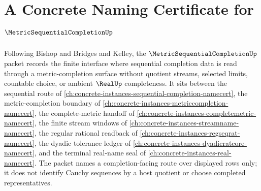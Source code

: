 \chapter{A Concrete Naming Certificate for $\MetricSequentialCompletionUp$}
\label{ch:concrete-instances-metric-sequential-completion-namecert}

Following Bishop and Bridges and Kelley, the $\MetricSequentialCompletionUp$ packet records the finite interface where sequential completion data is read through a metric-completion surface without quotient streams, selected limits, countable choice, or ambient $\RealUp$ completeness. It sits between the sequential route of \autoref{ch:concrete-instances-sequential-completion-namecert}, the metric-completion boundary of \autoref{ch:concrete-instances-metriccompletion-namecert}, the complete-metric handoff of \autoref{ch:concrete-instances-completemetric-namecert}, the finite stream windows of \autoref{ch:concrete-instances-streamname-namecert}, the regular rational readback of \autoref{ch:concrete-instances-regseqrat-namecert}, the dyadic tolerance ledger of \autoref{ch:concrete-instances-dyadicratcore-namecert}, and the terminal real-name seal of \autoref{ch:concrete-instances-real-namecert}. The packet names a completion-facing route over displayed rows only; it does not identify Cauchy sequences by a host quotient or choose completed representatives.

